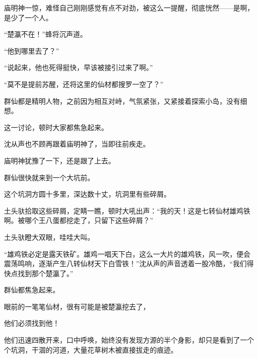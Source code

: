 \begin{this_body}
庙明神一惊，难怪自己刚刚感觉有点不对劲，被这么一提醒，彻底恍然——是啊，是少了一个人。

“楚瀛不在！”蜂将沉声道。

“他到哪里去了？”

“说起来，他也死得挺快，早该被接引过来了啊。”

“莫不是提前苏醒，还将这里的仙材都搜罗一空了？”

群仙都是精明人物，之前因为相互对峙，气氛紧张，又紧接着探索小岛，没有细想。

这一讨论，顿时大家都焦急起来。

沈从声也不顾再跟着庙明神了，当即往前疾走。

庙明神犹豫了一下，还是跟了上去。

群仙很快就来到一个大坑前。

这个坑洞方圆十多里，深达数十丈，坑洞里有些碎屑。

土头驮拾取这些碎屑，定睛一瞧，顿时大吼出声：“我的天！这是七转仙材雄鸡铁啊。被哪个王八蛋都挖走了，只留下这些碎屑？”

土头驮瞪大双眼，哇哇大叫。

“雄鸡铁必定是露天铁矿。雄鸡一唱天下白，这么一大片的雄鸡铁，风一吹，便会震荡鸣响，逐渐产生八转仙材天下白雪铁！”沈从声的声音透着一股冷酷，“我们得快点找到那个楚瀛了。”

群仙都焦急起来。

眼前的一笔笔仙材，很有可能是被楚瀛挖去了，

他们必须找到他！

他们迅速四散开来，口中呼唤，始终没有发现方源的半个身影，却只是看到了一个个坑洞，干涸的河道，大量花草树木被直接拔走的痕迹。

\end{this_body}

